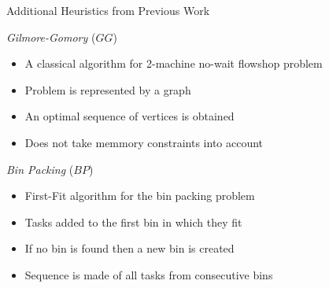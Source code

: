 \documentclass[mathserif,hyperref={pdfpagemode=FullScreen}]{beamer}
\begin{document}
\begin{frame}{Additional Heuristics from Previous Work}
\begin{block}{\textit{Gilmore-Gomory} ($GG$)}
	\begin{itemize}
		\item A classical algorithm for 2-machine no-wait flowshop problem
		\item Problem is represented by a graph
		\item An optimal sequence of vertices is obtained 
		\item Does not take memmory constraints into account
	\end{itemize}
\end{block}


\begin{block}{\textit{Bin Packing} ($BP$)}
	\begin{itemize}
		\item First-Fit algorithm for the bin packing problem
		\item Tasks added to the first bin in which they fit
		\item If no bin is found then a new bin is created
		\item Sequence is made of all tasks from consecutive bins
	\end{itemize}
\end{block}
\end{frame}
\end{document}
